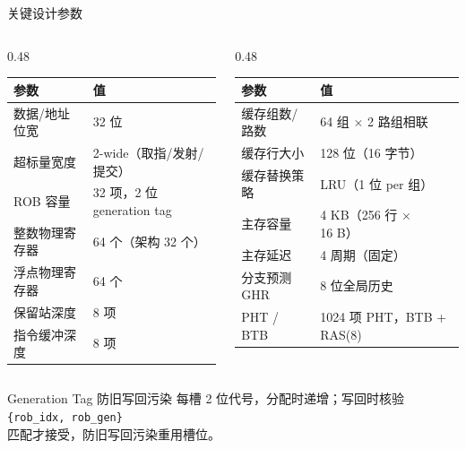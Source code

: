 \documentclass[aspectratio=169,xcolor={dvipsnames,svgnames},10pt]{beamer}
\newcommand{\code}[1]{\texttt{\small\color{PrimaryBlue}#1}}
\begin{document}
\begin{frame}[shrink=10]{关键设计参数}
  \begin{columns}[T]
    \begin{column}{0.48\textwidth}
      \small\renewcommand{\arraystretch}{1.22}
      \begin{tabular}{ll}
        \toprule
        \textbf{参数} & \textbf{值} \\
        \midrule
        数据/地址位宽    & 32 位 \\
        超标量宽度       & 2-wide（取指/发射/提交）\\
        ROB 容量         & 32 项，2 位 generation tag \\
        整数物理寄存器   & 64 个（架构 32 个）\\
        浮点物理寄存器   & 64 个 \\
        保留站深度       & 8 项 \\
        指令缓冲深度     & 8 项 \\
        \bottomrule
      \end{tabular}
    \end{column}
    \begin{column}{0.48\textwidth}
      \small\renewcommand{\arraystretch}{1.22}
      \begin{tabular}{ll}
        \toprule
        \textbf{参数} & \textbf{值} \\
        \midrule
        缓存组数/路数    & 64 组 $\times$ 2 路组相联 \\
        缓存行大小       & 128 位（16 字节）\\
        缓存替换策略     & LRU（1 位 per 组）\\
        主存容量         & 4 KB（256 行 $\times$ 16 B）\\
        主存延迟         & 4 周期（固定）\\
        分支预测 GHR     & 8 位全局历史 \\
        PHT / BTB        & 1024 项 PHT，BTB + RAS(8) \\
        \bottomrule
      \end{tabular}
    \end{column}
  \end{columns}
  \vspace{0.3cm}
  \begin{exampleblock}{Generation Tag 防旧写回污染}
    \footnotesize
    每槽 2 位代号，分配时递增；写回时核验\\
    \quad\code{\{rob\_idx, rob\_gen\}}\\
    匹配才接受，防旧写回污染重用槽位。
  \end{exampleblock}
\end{frame}
\end{document}

